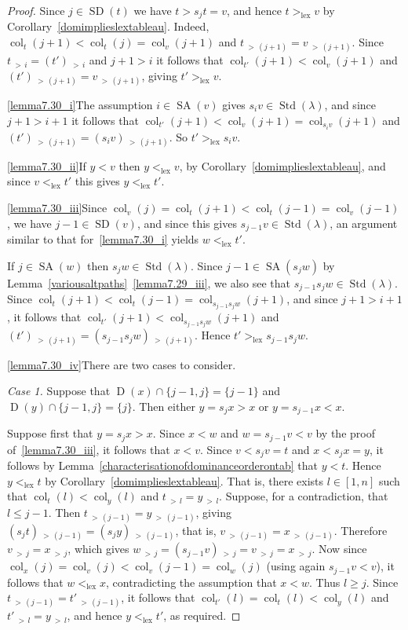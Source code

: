 \documentclass[ALCO,ThmDefs,Unicode,epreuves]{cedram}
\newenvironment{Case}[1]{\smallskip\noindent\emph{Case #1}\endgraf
 \nobreak\noindent\ignorespaces}{\endgraf\smallskip}
\DeclareMathOperator{\lex}{lex}
\DeclareMathOperator{\col}{col}
\newcommand{\morethan}[2]{#1\,{_{>\,#2}}}
\DeclareMathOperator{\STD}{Std}
\DeclareMathOperator{\SD}{SD}
\DeclareMathOperator{\SA}{SA}
\DeclareMathOperator{\D}{D}
\begin{document}
\begin{proof}
Since $j\in\SD(t)$ we have $t>s_jt=v$, and hence
$t>_{\lex}v$ by Corollary~\ref{domimplieslextableau}. Indeed,
$\col_t(j+1)<\col_t(j)=\col_v(j+1)$ and $\morethan t{(j+1)}=\morethan v{(j+1)}$.
Since $\morethan ti=\morethan {(t')}i$ and $j+1>i$ it follows that
$\col_{t'}(j+1)<\col_v(j+1)$ and
$\morethan {(t')}{(j+1)}=\morethan v{(j+1)}$,
giving $t'>_{\lex}v$.

\ref{lemma7.30_i}\quad The assumption $i\in\SA(v)$ gives $s_iv\in\STD(\lambda)$,
and since $j+1>i+1$ it follows that $\col_{t'}(j+1)<\col_v(j+1)=\col_{s_iv}(j+1)$
and $\morethan{(t')}{(j+1)}=\morethan{(s_iv)}{(j+1)}$. So $t'>_{\lex}s_iv$.

\ref{lemma7.30_ii}\quad If $y<v$ then $y<_{\lex} v$, by Corollary~\ref{domimplieslextableau}, and
since $v<_{\lex} t'$ this gives $y<_{\lex}t'$.

\ref{lemma7.30_iii}\quad Since $\col_v(j)=\col_t(j+1)<\col_t(j-1)=\col_v(j-1)$, we have
$j-1\in\SD(v)$, and since this gives $s_{j-1}v\in\STD(\lambda)$, an argument similar
to that for~\ref{lemma7.30_i} yields $w<_{\lex}t'$.

If $j\in\SA(w)$ then $s_jw\in\STD(\lambda)$. Since $j-1\in\SA(s_jw)$
by Lemma~\ref{variousaltpaths}~\ref{lemma7.29_iii}, we also see that $s_{j-1}s_jw\in\STD(\lambda)$.
Since $\col_t(j+1)<\col_t(j-1)=\col_{s_{j-1}s_jw}(j+1)$, and
since $j+1>i+1$, it follows that $\col_{t'}(j+1)<\col_{s_{j-1}s_jw}(j+1)$ and
$\morethan{(t')}{(j+1)}=\morethan{(s_{j-1}s_jw)}{(j+1)}$. Hence $t'>_{\lex}s_{j-1}s_jw$.

\ref{lemma7.30_iv}\quad There are two cases to consider.

\begin{Case}{1.} Suppose that $\D(x)\cap\{j-1,j\}=\{j-1\}$ and $\D(y)\cap\{j-1,j\}=\{j\}$.
Then either $y=s_jx>x$ or $y=s_{j-1}x<x$.

Suppose first that $y=s_{j}x>x$. Since $x<w$ and $w=s_{j-1}v<v$ by the proof of~\ref{lemma7.30_iii}, it
follows that $x<v$. Since $v<s_jv=t$ and $x<s_jx=y$, it follows by
 Lemma~\ref{characterisationofdominanceorderontab} that $y<t$. Hence
$y<_{\lex}t$ by Corollary~\ref{domimplieslextableau}. That is, there exists
$l\in[1,n]$ such that $\col_{t}(l)<\col_y(l)$ and
$\morethan tl=\morethan yl$. Suppose, for a contradiction, that $l\leqslant j-1$.
Then $\morethan t{(j-1)}=\morethan y{(j-1)}$, giving
$\morethan {(s_jt)}{(j-1)}=\morethan{(s_jy)}{(j-1)}$, that is,
$\morethan v{(j-1)}=\morethan x{(j-1)}$. Therefore $\morethan vj=\morethan xj$, which
gives $\morethan wj=\morethan{(s_{j-1}v)}j=\morethan vj=\morethan xj$.
Now since $\col_x(j)=\col_v(j)<\col_v(j-1)=\col_w(j)$ (using again
$s_{j-1}v<v$), it follows that $w<_{\lex}x$,
contradicting the assumption that $x<w$. Thus $l\geqslant j$. Since
$\morethan t{(j-1)}=\morethan {t'}{(j-1)}$, it follows that $\col_{t'}(l)=\col_t(l)<\col_y(l)$
and $\morethan {t'}l=\morethan yl$, and hence $y<_{\lex}t'$, as required.


\end{Case}
\end{proof}
\end{document}
